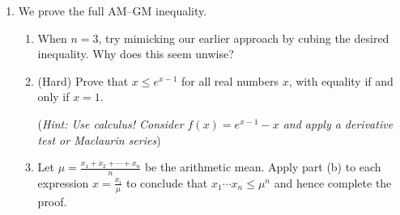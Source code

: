 \begin{exercises}{}{}
\begin{enumerate}
    
	\item\label{exs:amgm-full} We prove the full AM--GM inequality.
	\begin{enumerate}
	  \item When $n=3$, try mimicking our earlier approach by cubing the desired inequality. Why does this seem unwise?
	  \item (Hard) Prove that $x\le e^{x-1}$ for all real numbers $x$, with equality if and only if $x=1$.\par
	  (\emph{Hint: Use calculus! Consider $f(x)=e^{x-1}-x$ and apply a derivative test or Maclaurin series})
	  \item Let $\mu=\frac{x_1+x_2+\cdots +x_n}{n}$ be the arithmetic mean. Apply part (b) to each expression $x=\frac{x_i}\mu$ to conclude that $x_1\cdots x_n\le \mu^n$ and hence complete the proof.
	\end{enumerate}


\end{enumerate}

\end{exercises}

\clearpage


% 



	

